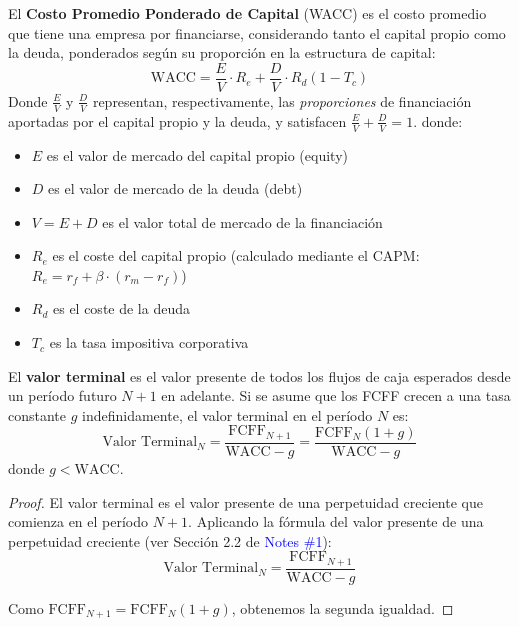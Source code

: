 \begin{definicion}
El \textbf{Costo Promedio Ponderado de Capital} (WACC) es el costo promedio que tiene una empresa por financiarse, considerando tanto el capital propio como la deuda, ponderados según su proporción en la estructura de capital:
\begin{equation}
\text{WACC} = \frac{E}{V} \cdot R_e + \frac{D}{V} \cdot R_d (1 - T_c)
\end{equation}
Donde $\frac{E}{V}$ y $\frac{D}{V}$ representan, respectivamente, las \textit{proporciones} de financiación aportadas por el capital propio y la deuda, y satisfacen $\frac{E}{V} + \frac{D}{V} = 1$.
donde:
\begin{itemize}
\item $E$ es el valor de mercado del capital propio (equity)
\item $D$ es el valor de mercado de la deuda (debt)
\item $V = E + D$ es el valor total de mercado de la financiación
\item $R_e$ es el coste del capital propio (calculado mediante el CAPM: $R_e = r_f + \beta \cdot (r_m - r_f)$)
\item $R_d$ es el coste de la deuda
\item $T_c$ es la tasa impositiva corporativa
\end{itemize}
\end{definicion}

\begin{definicion}
El \textbf{valor terminal} es el valor presente de todos los flujos de caja esperados desde un período futuro $N+1$ en adelante. Si se asume que los FCFF crecen a una tasa constante $g$ indefinidamente, el valor terminal en el período $N$ es:
\begin{equation}
\text{Valor Terminal}_N = \frac{\text{FCFF}_{N+1}}{\text{WACC} - g} = \frac{\text{FCFF}_N (1 + g)}{\text{WACC} - g}
\end{equation}
donde $g < \text{WACC}$.
\end{definicion}

\begin{proof}
El valor terminal es el valor presente de una perpetuidad creciente que comienza en el período $N+1$. Aplicando la fórmula del valor presente de una perpetuidad creciente (ver Sección 2.2 de \textcolor{blue}{Notes \#1}):
$$\text{Valor Terminal}_N = \frac{\text{FCFF}_{N+1}}{\text{WACC} - g}$$

Como $\text{FCFF}_{N+1} = \text{FCFF}_N (1 + g)$, obtenemos la segunda igualdad.
\end{proof}

